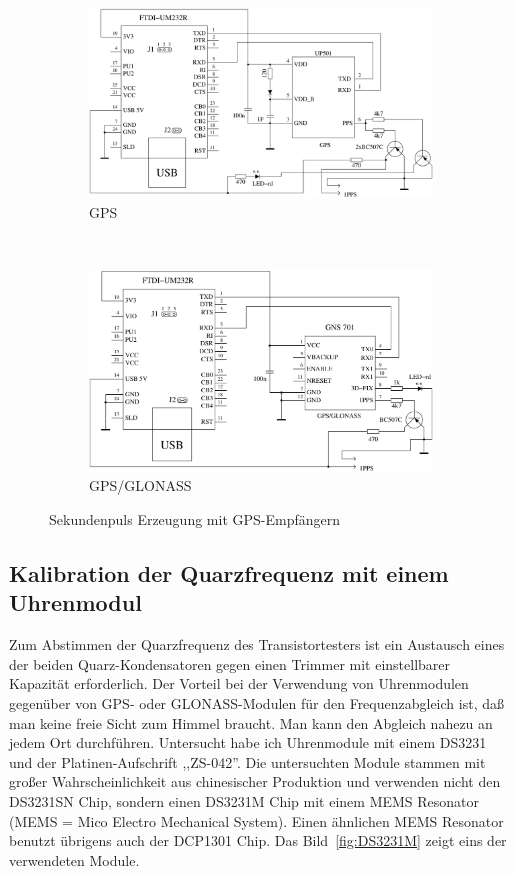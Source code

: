 \begin{figure}[H]
  \begin{subfigure}[b]{.5\textwidth}
    \centering
    \includegraphics[width=.95\textwidth]{../FIG/GPS_UP501.pdf}
    \caption{GPS}
  \end{subfigure}
  ~
  \begin{subfigure}[b]{.5\textwidth}
    \centering
    \includegraphics[width=.95\textwidth]{../FIG/GPS_GNS701.pdf}
    \caption{GPS/GLONASS}
  \end{subfigure}
  \caption{Sekundenpuls Erzeugung mit GPS-Empfängern }
  \label{fig:GPS-1PPS}
\end{figure}

\subsection{Kalibration der Quarzfrequenz mit einem Uhrenmodul}

Zum Abstimmen der Quarzfrequenz des Transistortesters ist ein Austausch eines der beiden Quarz-Kondensatoren 
gegen einen Trimmer mit einstellbarer Kapazität erforderlich.
Der Vorteil bei der Verwendung von Uhrenmodulen gegenüber von GPS- oder GLONASS-Modulen für den Frequenzabgleich ist,
daß man keine freie Sicht zum Himmel braucht. Man kann den Abgleich nahezu an jedem Ort durchführen.
Untersucht habe ich Uhrenmodule mit einem DS3231 und der Platinen-Aufschrift ,,ZS-042''.
Die untersuchten Module stammen mit großer Wahrscheinlichkeit aus chinesischer Produktion und verwenden
nicht den DS3231SN Chip, sondern einen DS3231M Chip mit einem MEMS Resonator (MEMS = Mico Electro Mechanical System). 
Einen ähnlichen MEMS Resonator benutzt übrigens auch der DCP1301 Chip.
Das Bild~\ref{fig:DS3231M} zeigt eins der verwendeten Module.

